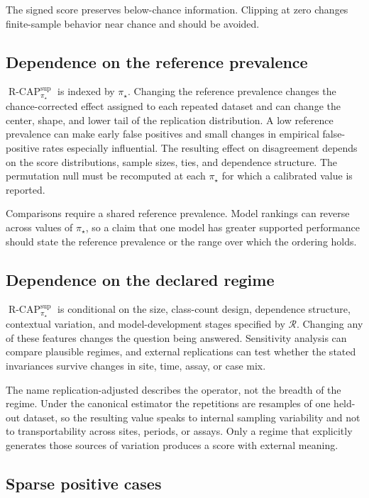\documentclass[11pt]{article}
\newcommand{\Regime}{\mathcal{R}}
\newcommand{\RCAP}{\operatorname{R\text{-}CAP}^{\mathrm{sup}}_{\pi_\star}}
\theoremstyle{remark}
\begin{document}
The signed score preserves below-chance information. Clipping at zero changes finite-sample behavior near chance and should be avoided.

\subsection{Dependence on the reference prevalence}

$\RCAP$ is indexed by $\pi_\star$. Changing the reference prevalence changes the chance-corrected effect assigned to each repeated dataset and can change the center, shape, and lower tail of the replication distribution. A low reference prevalence can make early false positives and small changes in empirical false-positive rates especially influential. The resulting effect on disagreement depends on the score distributions, sample sizes, ties, and dependence structure. The permutation null must be recomputed at each $\pi_\star$ for which a calibrated value is reported.

Comparisons require a shared reference prevalence. Model rankings can reverse across values of $\pi_\star$, so a claim that one model has greater supported performance should state the reference prevalence or the range over which the ordering holds.

\subsection{Dependence on the declared regime}

$\RCAP$ is conditional on the size, class-count design, dependence structure, contextual variation, and model-development stages specified by $\Regime$. Changing any of these features changes the question being answered. Sensitivity analysis can compare plausible regimes, and external replications can test whether the stated invariances survive changes in site, time, assay, or case mix.

The name replication-adjusted describes the operator, not the breadth of the regime. Under the canonical estimator the repetitions are resamples of one held-out dataset, so the resulting value speaks to internal sampling variability and not to transportability across sites, periods, or assays. Only a regime that explicitly generates those sources of variation produces a score with external meaning.

\subsection{Sparse positive cases}
\label{sec:sparse}
\end{document}

